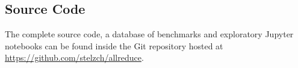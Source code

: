 \subsection{Source Code}
The complete source code, a database of benchmarks and exploratory Jupyter notebooks can be found inside the Git repository hosted at \url{https://github.com/stelzch/allreduce}.